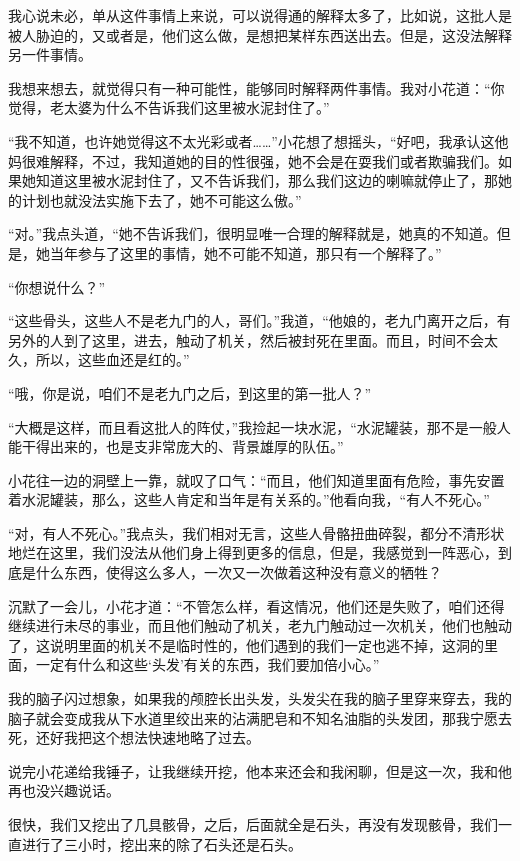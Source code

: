 我心说未必，单从这件事情上来说，可以说得通的解释太多了，比如说，这批人是被人胁迫的，又或者是，他们这么做，是想把某样东西送出去。但是，这没法解释另一件事情。

我想来想去，就觉得只有一种可能性，能够同时解释两件事情。我对小花道：“你觉得，老太婆为什么不告诉我们这里被水泥封住了。”

“我不知道，也许她觉得这不太光彩或者……”小花想了想摇头，“好吧，我承认这他妈很难解释，不过，我知道她的目的性很强，她不会是在耍我们或者欺骗我们。如果她知道这里被水泥封住了，又不告诉我们，那么我们这边的喇嘛就停止了，那她的计划也就没法实施下去了，她不可能这么傲。”

“对。”我点头道，“她不告诉我们，很明显唯一合理的解释就是，她真的不知道。但是，她当年参与了这里的事情，她不可能不知道，那只有一个解释了。”

“你想说什么？”

“这些骨头，这些人不是老九门的人，哥们。”我道，“他娘的，老九门离开之后，有另外的人到了这里，进去，触动了机关，然后被封死在里面。而且，时间不会太久，所以，这些血还是红的。”

“哦，你是说，咱们不是老九门之后，到这里的第一批人？”

“大概是这样，而且看这批人的阵仗，”我捡起一块水泥，“水泥罐装，那不是一般人能干得出来的，也是支非常庞大的、背景雄厚的队伍。”

小花往一边的洞壁上一靠，就叹了口气：“而且，他们知道里面有危险，事先安置着水泥罐装，那么，这些人肯定和当年是有关系的。”他看向我，“有人不死心。”

“对，有人不死心。”我点头，我们相对无言，这些人骨骼扭曲碎裂，都分不清形状地烂在这里，我们没法从他们身上得到更多的信息，但是，我感觉到一阵恶心，到底是什么东西，使得这么多人，一次又一次做着这种没有意义的牺牲？

沉默了一会儿，小花才道：“不管怎么样，看这情况，他们还是失败了，咱们还得继续进行未尽的事业，而且他们触动了机关，老九门触动过一次机关，他们也触动了，这说明里面的机关不是临时性的，他们遇到的我们一定也逃不掉，这洞的里面，一定有什么和这些‘头发’有关的东西，我们要加倍小心。”

我的脑子闪过想象，如果我的颅腔长出头发，头发尖在我的脑子里穿来穿去，我的脑子就会变成我从下水道里绞出来的沾满肥皂和不知名油脂的头发团，那我宁愿去死，还好我把这个想法快速地略了过去。

说完小花递给我锤子，让我继续开挖，他本来还会和我闲聊，但是这一次，我和他再也没兴趣说话。

很快，我们又挖出了几具骸骨，之后，后面就全是石头，再没有发现骸骨，我们一直进行了三小时，挖出来的除了石头还是石头。

